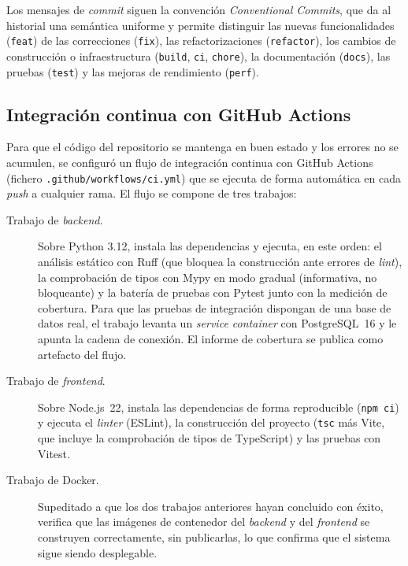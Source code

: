Los mensajes de \emph{commit} siguen la convención \emph{Conventional Commits},
que da al historial una semántica uniforme y permite distinguir las nuevas
funcionalidades (\texttt{feat}) de las correcciones (\texttt{fix}), las
refactorizaciones (\texttt{refactor}), los cambios de construcción o
infraestructura (\texttt{build}, \texttt{ci}, \texttt{chore}), la documentación
(\texttt{docs}), las pruebas (\texttt{test}) y las mejoras de rendimiento
(\texttt{perf}).

\subsection{Integración continua con GitHub Actions}
\label{sec:met-actions}

Para que el código del repositorio se mantenga en buen estado y los errores no se
acumulen, se configuró un flujo de integración continua con GitHub Actions
(fichero \texttt{.github/workflows/ci.yml}) que se ejecuta de forma automática en
cada \emph{push} a cualquier rama. El flujo se compone de tres trabajos:

\begin{description}
  \item[Trabajo de \emph{backend}.] Sobre Python 3.12, instala las dependencias y
        ejecuta, en este orden: el análisis estático con Ruff (que bloquea la
        construcción ante errores de \emph{lint}), la comprobación de tipos con
        Mypy en modo gradual (informativa, no bloqueante) y la batería de pruebas
        con Pytest junto con la medición de cobertura. Para que las pruebas de
        integración dispongan de una base de datos real, el trabajo levanta un
        \emph{service container} con PostgreSQL~16 y le apunta la cadena de
        conexión. El informe de cobertura se publica como artefacto del flujo.

  \item[Trabajo de \emph{frontend}.] Sobre Node.js~22, instala las dependencias de
        forma reproducible (\texttt{npm ci}) y ejecuta el \emph{linter} (ESLint),
        la construcción del proyecto (\texttt{tsc} más Vite, que incluye la
        comprobación de tipos de TypeScript) y las pruebas con Vitest.

  \item[Trabajo de Docker.] Supeditado a que los dos trabajos anteriores hayan
        concluido con éxito, verifica que las imágenes de contenedor del
        \emph{backend} y del \emph{frontend} se construyen correctamente, sin
        publicarlas, lo que confirma que el sistema sigue siendo desplegable.
\end{description}

